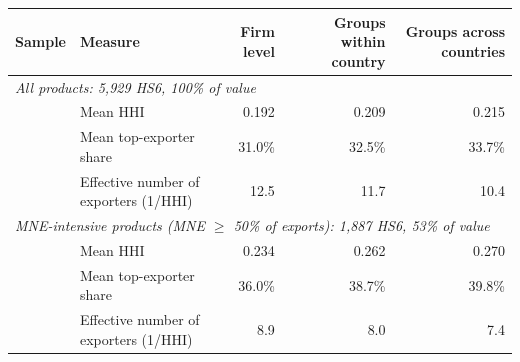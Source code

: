 \begin{tabular}{llrrr}
\toprule
Sample & Measure & Firm level & Groups within country & Groups across countries \\
\midrule
\multicolumn{5}{l}{\textit{All products: 5,929 HS6, 100\% of value}} \\
 & Mean HHI & 0.192 & 0.209 & 0.215 \\
 & Mean top-exporter share & 31.0\% & 32.5\% & 33.7\% \\
 & Effective number of exporters (1/HHI) & 12.5 & 11.7 & 10.4 \\
\multicolumn{5}{l}{\textit{MNE-intensive products (MNE $\geq$ 50\% of exports): 1,887 HS6, 53\% of value}} \\
 & Mean HHI & 0.234 & 0.262 & 0.270 \\
 & Mean top-exporter share & 36.0\% & 38.7\% & 39.8\% \\
 & Effective number of exporters (1/HHI) & 8.9 & 8.0 & 7.4 \\
\bottomrule
\end{tabular}
